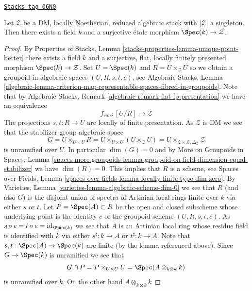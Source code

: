 \begin{lemma}
\label{stacks-morphisms-lemma-DM-residual-gerbe}
\href{https://stacks.math.columbia.edu/tag/06N0}{\texttt{Stacks tag 06N0}}

Let $\mathcal{Z}$ be a DM, locally Noetherian, reduced algebraic stack
with $|\mathcal{Z}|$ a singleton. Then there exists a field $k$ and
a surjective \'etale morphism $\Spec(k) \to \mathcal{Z}$.
\end{lemma}

\begin{proof}
By
Properties of Stacks, Lemma \ref{stacks-properties-lemma-unique-point-better}
there exists a field $k$ and a surjective, flat, locally finitely presented
morphism $\Spec(k) \to \mathcal{Z}$. Set $U = \Spec(k)$ and
$R = U \times_\mathcal{Z} U$ so we obtain a groupoid in algebraic spaces
$(U, R, s, t, c)$, see
Algebraic Stacks, Lemma
\ref{algebraic-lemma-criterion-map-representable-spaces-fibred-in-groupoids}.
Note that by
Algebraic Stacks, Remark \ref{algebraic-remark-flat-fp-presentation}
we have an equivalence
$$
f_{can} : [U/R] \longrightarrow \mathcal{Z}
$$
The projections $s, t : R \to U$ are locally of finite presentation.
As $\mathcal{Z}$ is DM we see that the stabilizer group algebraic space
$$
G = U \times_{U \times U} R = U \times_{U \times U} (U \times_\mathcal{Z} U) =
U \times_{\mathcal{Z} \times \mathcal{Z}, \Delta_\mathcal{Z}} \mathcal{Z}
$$
is unramified over $U$. In particular $\dim(G) = 0$ and by
More on Groupoids in Spaces, Lemma
\ref{spaces-more-groupoids-lemma-groupoid-on-field-dimension-equal-stabilizer}
we have $\dim(R) = 0$. This implies that $R$ is a scheme, see
Spaces over Fields, Lemma
\ref{spaces-over-fields-lemma-locally-finite-type-dim-zero}.
By
Varieties, Lemma \ref{varieties-lemma-algebraic-scheme-dim-0}
we see that $R$ (and also $G$) is the disjoint union of spectra of
Artinian local rings finite over $k$ via either $s$ or $t$. Let
$P = \Spec(A) \subset R$ be the open and
closed subscheme whose underlying point is the identity $e$ of the groupoid
scheme $(U, R, s, t, c)$. As
$s \circ e = t \circ e = \text{id}_{\Spec(k)}$ we see that $A$
is an Artinian local ring whose residue field is identified with $k$
via either $s^\sharp : k \to A$ or $t^\sharp : k \to A$.
Note that $s, t : \Spec(A) \to \Spec(k)$
are finite (by the lemma referenced above). Since
$G \to \Spec(k)$ is unramified we see that
$$
G \cap P = P \times_{U \times U} U = \Spec(A \otimes_{k \otimes k} k)
$$
is unramified over $k$. On the other hand $A \otimes_{k \otimes k} k$

\end{proof}
